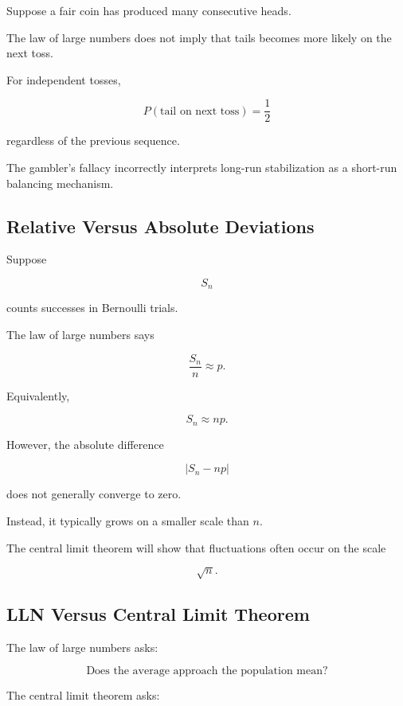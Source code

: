 Suppose a fair coin has produced many consecutive heads.

The law of large numbers does not imply that tails becomes more likely
on the next toss.

For independent tosses,

\[
\boxed{
P(\text{tail on next toss})
=
\frac12
}
\]

regardless of the previous sequence.

The gambler's fallacy incorrectly interprets long-run stabilization as a
short-run balancing mechanism.

\subsection{Relative Versus Absolute Deviations}
\label{subsec:relative-absolute-deviations}

Suppose

\[
S_n
\]

counts successes in Bernoulli trials.

The law of large numbers says

\[
\frac{S_n}{n}
\approx
p.
\]

Equivalently,

\[
S_n
\approx
np.
\]

However, the absolute difference

\[
|S_n-np|
\]

does not generally converge to zero.

Instead, it typically grows on a smaller scale than \(n\).

The central limit theorem will show that fluctuations often occur on
the scale

\[
\sqrt{n}.
\]

\subsection{LLN Versus Central Limit Theorem}
\label{subsec:lln-versus-clt}

The law of large numbers asks:

\[
\boxed{
\text{Does the average approach the population mean?}
}
\]

The central limit theorem asks:

